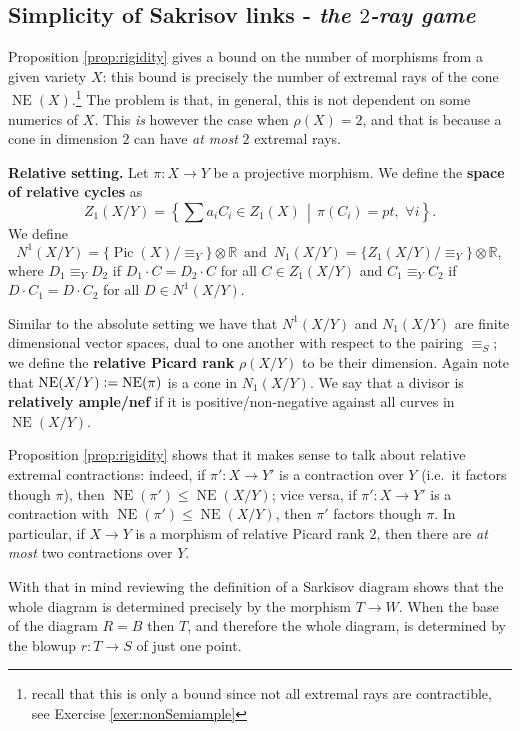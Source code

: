 \documentclass[a4paper,11pt]{amsart}
\def\NE{\operatorname{NE}}
\def\Pic{\operatorname{Pic}}
\newcommand{\RR}{\mathbb{R}}
\newcommand{\defeq}{\vcentcolon=}
\begin{document}
\subsection{Simplicity of Sakrisov links - \emph{the $2$-ray game}}\label{subsec:2rayGame}

Proposition \ref{prop:rigidity} gives a bound on the number of morphisms from a given variety $X$: 
this bound is precisely the number of extremal rays of the cone $\NE(X)$.\footnote{recall that this is only a bound since not all extremal rays are contractible, see Exercise \ref{exer:nonSemiample}}
The problem is that, in general, this is not dependent on some numerics of $X$.
This \emph{is} however the case when $\rho(X)=2$, and that is because a cone in dimension $2$ can have \emph{at most} $2$ extremal rays.

\vspace{.2cm}

\noindent\textbf{Relative setting.}
	Let $\pi\colon X \to Y$ be a projective morphism.
	We define the \textbf{space of relative cycles} as
	\[
	Z_1(X/Y) = \left\{ \sum a_i C_i \in Z_1(X) \,\middle|\, \pi(C_i) = pt,\,\, \forall i \right\}.
	\]
	We define
	\[
	N^1(X/Y) = \{\Pic(X)/\equiv_Y\}\otimes \RR \, \text{ and } \, N_1(X/Y) = \{Z_1(X/Y)/\equiv_Y\}\otimes \RR,
	\]
	where $D_1 \equiv_Y D_2$ if $D_1\cdot C = D_2\cdot C$ for all $C \in Z_1(X/Y)$ and $C_1 \equiv_Y C_2$ if $D\cdot C_1 = D\cdot C_2$ for all $D \in N^1(X/Y)$.
	
	Similar to the absolute setting we have that $N^1(X/Y)$ and $N_1(X/Y)$ are finite dimensional vector spaces, dual to one another with respect to the pairing $\equiv_S$;
	we define the \textbf{relative Picard rank} $\rho(X/Y)$ to be their dimension.
	Again note that $\NE(X/Y) \defeq \NE(\pi)$ is a cone in $N_1(X/Y)$.	
	We say that a divisor is \textbf{relatively ample/nef} if it is positive/non-negative against all curves in $\NE(X/Y)$.
\vspace{.2cm}

Proposition \ref{prop:rigidity} shows that it makes sense to talk about relative extremal contractions:
indeed, if $\pi'\colon X \to Y'$ is a contraction over $Y$ (i.e.\ it factors though $\pi$), then $\NE(\pi') \leq \NE(X/Y)$;
vice versa, if $\pi'\colon X \to Y'$ is a contraction with  $\NE(\pi') \leq \NE(X/Y)$, then $\pi'$ factors though $\pi$.
In particular, if $X \to Y$ is a morphism of relative Picard rank $2$, then there are \emph{at most} two contractions over $Y$.

With that in mind reviewing the definition of a Sarkisov diagram shows that the whole diagram is determined precisely by the morphism $T \to W$.
When the base of the diagram $R = B$ then $T$, and therefore the whole diagram, is determined by the blowup $r\colon T \to S$ of just one point.
\end{document}
